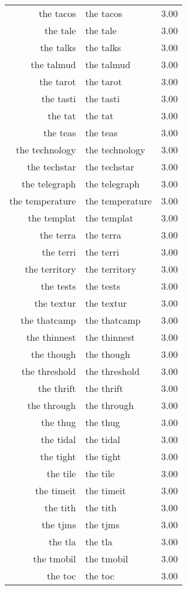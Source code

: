 \begin{table}[ht]
\begin{tabular}{rlr}
  the tacos & the tacos & 3.00 \\ 
  the tale & the tale & 3.00 \\ 
  the talks & the talks & 3.00 \\ 
  the talmud & the talmud & 3.00 \\ 
  the tarot & the tarot & 3.00 \\ 
  the tasti & the tasti & 3.00 \\ 
  the tat & the tat & 3.00 \\ 
  the teas & the teas & 3.00 \\ 
  the technology & the technology & 3.00 \\ 
  the techstar & the techstar & 3.00 \\ 
  the telegraph & the telegraph & 3.00 \\ 
  the temperature & the temperature & 3.00 \\ 
  the templat & the templat & 3.00 \\ 
  the terra & the terra & 3.00 \\ 
  the terri & the terri & 3.00 \\ 
  the territory & the territory & 3.00 \\ 
  the tests & the tests & 3.00 \\ 
  the textur & the textur & 3.00 \\ 
  the thatcamp & the thatcamp & 3.00 \\ 
  the thinnest & the thinnest & 3.00 \\ 
  the though & the though & 3.00 \\ 
  the threshold & the threshold & 3.00 \\ 
  the thrift & the thrift & 3.00 \\ 
  the through & the through & 3.00 \\ 
  the thug & the thug & 3.00 \\ 
  the tidal & the tidal & 3.00 \\ 
  the tight & the tight & 3.00 \\ 
  the tile & the tile & 3.00 \\ 
  the timeit & the timeit & 3.00 \\ 
  the tith & the tith & 3.00 \\ 
  the tjms & the tjms & 3.00 \\ 
  the tla & the tla & 3.00 \\ 
  the tmobil & the tmobil & 3.00 \\ 
  the toc & the toc & 3.00 \\ 

\end{tabular}
\end{table}
